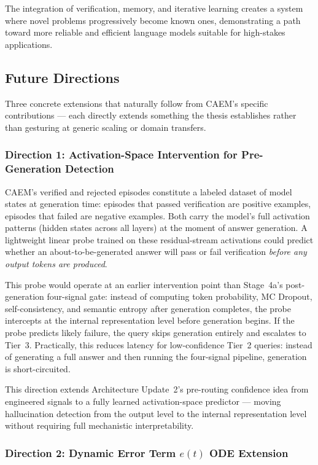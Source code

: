 \documentclass[12pt,a4paper]{article}
\theoremstyle{definition}
\begin{document}
The integration of verification, memory, and iterative learning creates a system where novel problems progressively become known ones, demonstrating a path toward more reliable and efficient language models suitable for high-stakes applications.

\subsection{Future Directions}

Three concrete extensions that naturally follow from CAEM's specific contributions — each directly extends something the thesis establishes rather than gesturing at generic scaling or domain transfers.

\subsubsection{Direction 1: Activation-Space Intervention for Pre-Generation Detection}

CAEM's verified and rejected episodes constitute a labeled dataset of model states at generation time: episodes that passed verification are positive examples, episodes that failed are negative examples. Both carry the model's full activation patterns (hidden states across all layers) at the moment of answer generation. A lightweight linear probe trained on these residual-stream activations could predict whether an about-to-be-generated answer will pass or fail verification \textit{before any output tokens are produced}.

This probe would operate at an earlier intervention point than Stage~4a's post-generation four-signal gate: instead of computing token probability, MC Dropout, self-consistency, and semantic entropy after generation completes, the probe intercepts at the internal representation level before generation begins. If the probe predicts likely failure, the query skips generation entirely and escalates to Tier~3. Practically, this reduces latency for low-confidence Tier~2 queries: instead of generating a full answer and then running the four-signal pipeline, generation is short-circuited.

This direction extends Architecture Update~2's pre-routing confidence idea from engineered signals to a fully learned activation-space predictor --- moving hallucination detection from the output level to the internal representation level without requiring full mechanistic interpretability.

\subsubsection{Direction 2: Dynamic Error Term $e(t)$ ODE Extension}
\end{document}

